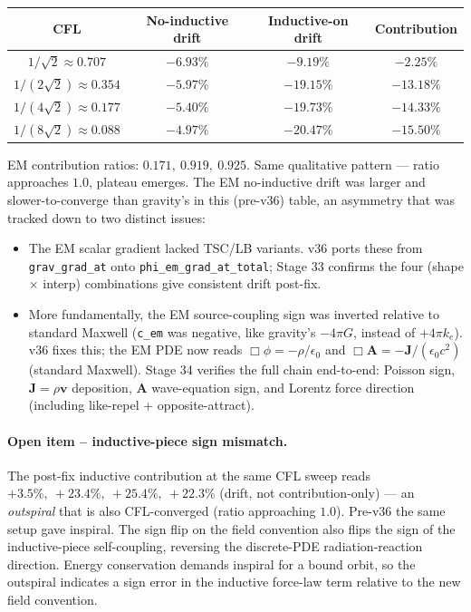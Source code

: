 \documentclass[11pt,a4paper]{article}
\newcommand{\vv}[1]{\mathbf{#1}}
\begin{document}
\begin{center}
\begin{tabular}{@{}cccc@{}}
\toprule
\textbf{CFL} & \textbf{No-inductive drift} & \textbf{Inductive-on drift} & \textbf{Contribution} \\
\midrule
$1/\sqrt{2}      \approx 0.707$ & $-6.93\%$ & $-9.19\%$  & $-2.25\%$ \\
$1/(2\sqrt{2})   \approx 0.354$ & $-5.97\%$ & $-19.15\%$ & $-13.18\%$ \\
$1/(4\sqrt{2})   \approx 0.177$ & $-5.40\%$ & $-19.73\%$ & $-14.33\%$ \\
$1/(8\sqrt{2})   \approx 0.088$ & $-4.97\%$ & $-20.47\%$ & $-15.50\%$ \\
\bottomrule
\end{tabular}
\end{center}

EM contribution ratios: $0.171,\ 0.919,\ 0.925$.  Same qualitative
pattern --- ratio approaches $1.0$, plateau emerges.  The EM
no-inductive drift was larger and slower-to-converge than gravity's
in this (pre-v36) table, an asymmetry that was tracked down to two
distinct issues:
\begin{itemize}
  \item The EM scalar gradient lacked TSC/LB variants.  v36 ports
        these from \texttt{grav\_grad\_at} onto
        \texttt{phi\_em\_grad\_at\_total}; Stage 33 confirms the four
        (shape $\times$ interp) combinations give consistent drift
        post-fix.
  \item More fundamentally, the EM source-coupling sign was inverted
        relative to standard Maxwell (\texttt{c\_em} was negative,
        like gravity's $-4\pi G$, instead of $+4\pi k_e$).  v36 fixes
        this; the EM PDE now reads $\Box \phi = -\rho/\epsilon_0$ and
        $\Box \vv{A} = -\vv{J}/(\epsilon_0 c^2)$ (standard Maxwell).
        Stage 34 verifies the full chain end-to-end:
        Poisson sign, $\vv{J}=\rho\vv{v}$ deposition, $\vv{A}$
        wave-equation sign, and Lorentz force direction (including
        like-repel + opposite-attract).
\end{itemize}
\paragraph{Open item -- inductive-piece sign mismatch.}  The post-fix
inductive contribution at the same CFL sweep reads
$+3.5\%,\ +23.4\%,\ +25.4\%,\ +22.3\%$ (drift, not
contribution-only) --- an \emph{outspiral} that is also CFL-converged
(ratio approaching $1.0$).  Pre-v36 the same setup gave inspiral.
The sign flip on the field convention also flips the sign of the
inductive-piece self-coupling, reversing the discrete-PDE
radiation-reaction direction.  Energy conservation demands inspiral
for a bound orbit, so the outspiral indicates a sign error in the
inductive force-law term relative to the new field convention.
\end{document}
